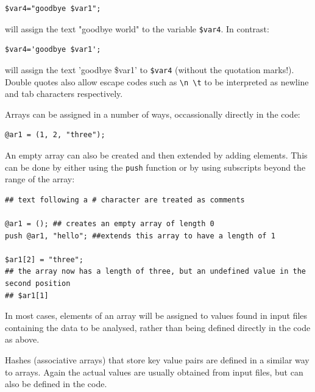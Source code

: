 \documentclass[11pt]{article}
\begin{document}
\begin{verbatim}
$var4="goodbye $var1";
\end{verbatim}

will assign the text "goodbye world" to the variable \texttt{\$var4}.
In contrast:

\begin{verbatim}
$var4='goodbye $var1';
\end{verbatim}

will assign the text 'goodbye \$var1' to \texttt{\$var4} (without the quotation
marks!).
Double quotes also allow escape codes such as \texttt{\textbackslash{}n \textbackslash{}t} to be interpreted
as newline and tab characters respectively.

Arrays can be assigned in a number of ways, occassionally directly in
the code:

\begin{verbatim}
@ar1 = (1, 2, "three");
\end{verbatim}

An empty array can also be created and then extended by adding elements.
This can be done by either using the \texttt{push} function or by using
subscripts beyond the range of the array:

\begin{verbatim}
## text following a # character are treated as comments

@ar1 = (); ## creates an empty array of length 0 
push @ar1, "hello"; ##extends this array to have a length of 1

$ar1[2] = "three"; 
## the array now has a length of three, but an undefined value in the second position 
## $ar1[1]
\end{verbatim}

In most cases, elements of an array will be assigned to values found in
input files containing the data to be analysed, rather than being
defined directly in the code as above.

Hashes (associative arrays) that store key value pairs are defined in a
similar way to arrays. Again the actual values are usually obtained from
input files, but can also be defined in the code.
\end{document}
